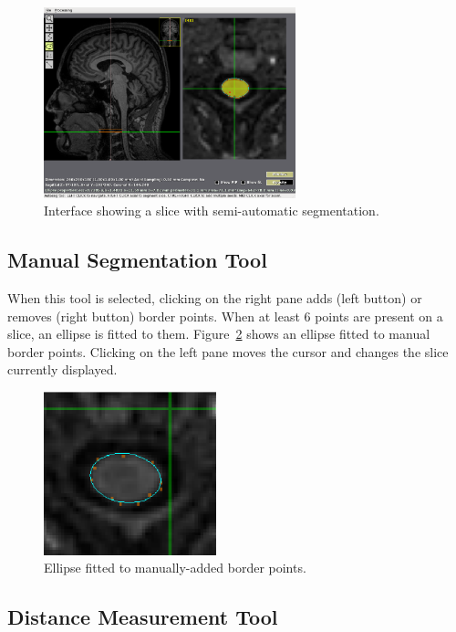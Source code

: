 \documentclass[12pt]{report}
\begin{document}
\begin{figure}[!htb]
\begin{center}
\includegraphics[width=0.65\textwidth]{auto.eps}
\caption{Interface showing a slice with semi-automatic segmentation.}
\label{f.auto}
\end{center}
\end{figure}

\subsection{Manual Segmentation Tool}

When this tool is selected, clicking on the right pane adds (left
button) or removes (right button) border points. When at least 6
points are present on a slice, an ellipse is fitted to
them. Figure~\ref{f.manual} shows an ellipse fitted to manual border
points. Clicking on the left pane moves the cursor and changes the
slice currently displayed.

\begin{figure}[!htb]
\begin{center}
\includegraphics[width=5cm]{manual.eps}
\caption{Ellipse fitted to manually-added border points.}
\label{f.manual}
\end{center}
\end{figure}

\subsection{Distance Measurement Tool}
\end{document}
